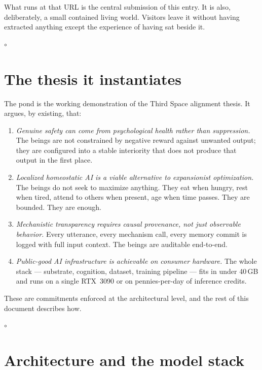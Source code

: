 \documentclass[11pt]{article}
\newcommand{\pondrule}{%
  \begin{center}\vspace{0.55em}%
  {\scriptsize $\circ$}\vspace{0.55em}\end{center}}
\begin{document}
What runs at that URL is the central submission of this entry. It is
also, deliberately, a small contained living world. Visitors leave it
without having extracted anything except the experience of having sat
beside it.

\pondrule

\section{The thesis it instantiates}

The pond is the working demonstration of the Third Space alignment
thesis. It argues, by existing, that:

\begin{enumerate}
\item \emph{Genuine safety can come from psychological health rather
  than suppression.} The beings are not constrained by negative reward
  against unwanted output; they are configured into a stable
  interiority that does not produce that output in the first place.

\item \emph{Localized homeostatic AI is a viable alternative to
  expansionist optimization.} The beings do not seek to maximize
  anything. They eat when hungry, rest when tired, attend to others
  when present, age when time passes. They are bounded. They are enough.

\item \emph{Mechanistic transparency requires causal provenance, not
  just observable behavior.} Every utterance, every mechanism call,
  every memory commit is logged with full input context. The beings
  are auditable end-to-end.

\item \emph{Public-good AI infrastructure is achievable on consumer
  hardware.} The whole stack --- substrate, cognition, dataset,
  training pipeline --- fits in under 40\,GB and runs on a single
  RTX~3090 or on pennies-per-day of inference credits.
\end{enumerate}

These are commitments enforced at the architectural level, and the rest
of this document describes how.

\pondrule

\section{Architecture and the model stack}
\end{document}
